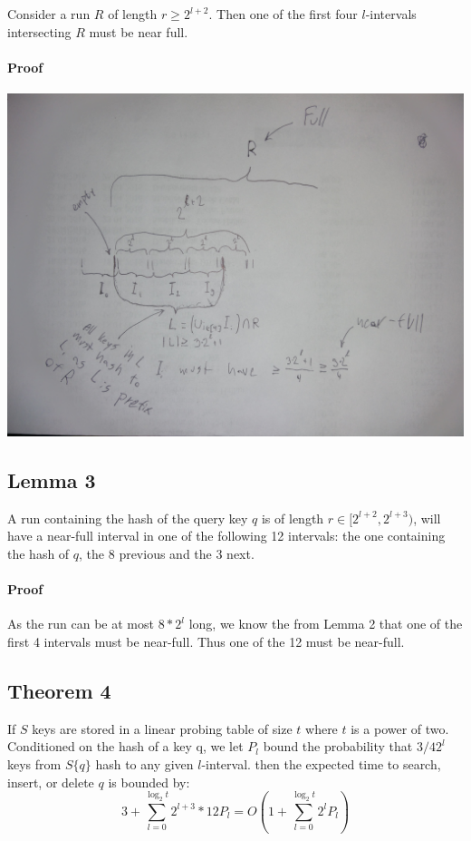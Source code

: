 \documentclass[a4paper, fleqn]{article}
\begin{document}
Consider a run $R$ of length $r \geq 2^{l+2}$. Then one of the first four $l$-intervals intersecting $R$ must be near full.
\paragraph{Proof}
\begin{center}
  \includegraphics[width=\textwidth]{./fig_1_8_linearProbing.jpg}
\end{center}
\subsection{Lemma 3}
A run containing the hash of the query key $q$ is of length $r \in [2^{l+2},2^{l+3})$, will have a near-full interval in one of the following 12 intervals: the one containing the hash of $q$, the 8 previous and the 3 next.
\paragraph{Proof}
As the run can be at most $8 * 2^l$ long, we know the from Lemma 2 that one of the first 4 intervals must be near-full. Thus one of the 12 must be near-full.
\subsection{Theorem 4}
If $S$ keys are stored in a linear probing table of size $t$ where $t$ is a power of two. Conditioned on the hash of a key q, we let $P_l$ bound the probability that $3/4 2^l$ keys from $S\{q\}$ hash to any given $l$-interval. then the expected time to search, insert, or delete $q$ is bounded by:
$$
3 + \sum_{l=0}^{\log_2 t} 2^{l+3} * 12P_l = O(1+\sum_{l=0}^{\log_2 t}2^lP_l)
$$
\end{document}
